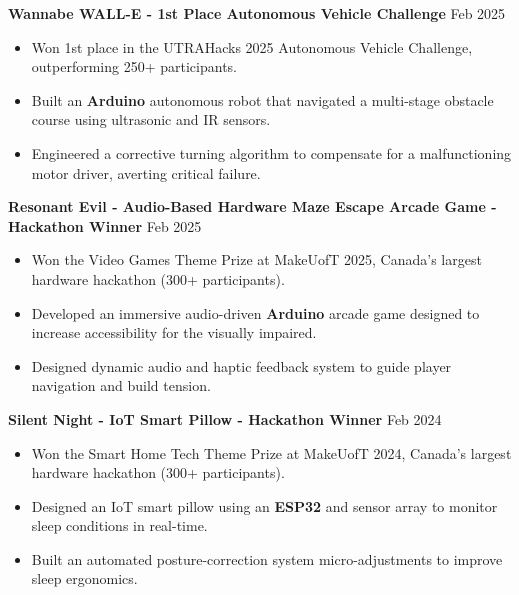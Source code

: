 \documentclass[10pt,letterpaper]{article}
\begin{document}
\textbf{Wannabe WALL-E - 1st Place Autonomous Vehicle Challenge} \hfill Feb 2025 \\
\begin{itemize}
    \item Won 1st place in the UTRAHacks 2025 Autonomous Vehicle Challenge, outperforming 250+ participants. 
    \item Built an \textbf{Arduino} autonomous robot that navigated a multi-stage obstacle course using ultrasonic and IR sensors.
    \item Engineered a corrective turning algorithm to compensate for a malfunctioning motor driver, averting critical failure. 
\end{itemize}

\textbf{Resonant Evil - Audio-Based Hardware Maze Escape Arcade Game - Hackathon Winner} \hfill Feb 2025 \\
\begin{itemize}
    \item Won the Video Games Theme Prize at MakeUofT 2025, Canada's largest hardware hackathon (300+ participants). 
    \item Developed an immersive audio-driven \textbf{Arduino} arcade game designed to increase accessibility for the visually impaired.
    \item Designed dynamic audio and haptic feedback system to guide player navigation and build tension. 
\end{itemize}





\textbf{Silent Night - IoT Smart Pillow - Hackathon Winner} \hfill Feb 2024 \\
\begin{itemize}
    \item Won the Smart Home Tech Theme Prize at MakeUofT 2024, Canada's largest hardware hackathon (300+ participants).  
    \item Designed an IoT smart pillow using an \textbf{ESP32} and sensor array to monitor sleep conditions in real-time.
    \item Built an automated posture-correction system micro-adjustments to improve sleep ergonomics. 
\end{itemize}
\end{document}
